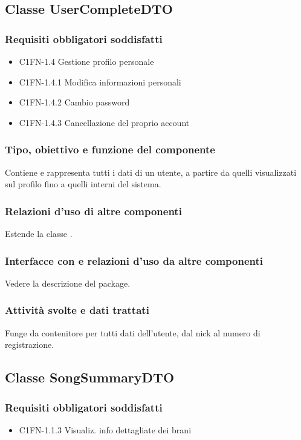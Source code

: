 \subsection{Classe UserCompleteDTO}
\subsubsection*{Requisiti obbligatori soddisfatti}
\begin{itemize}
	\item C1FN-1.4 Gestione profilo personale
	\item C1FN-1.4.1 Modifica informazioni personali
	\item C1FN-1.4.2 Cambio password
	\item C1FN-1.4.3 Cancellazione del proprio account
\end{itemize}
\subsubsection*{Tipo, obiettivo e funzione del componente}
Contiene e rappresenta tutti i dati di un utente, a partire da quelli
visualizzati sul profilo fino a quelli interni del sistema.
\subsubsection*{Relazioni d'uso di altre componenti}
Estende la classe .
\subsubsection*{Interfacce con e relazioni d'uso da altre componenti}
Vedere la descrizione del package.
\subsubsection*{Attivit\`a svolte e dati trattati}
Funge da contenitore per tutti dati dell'utente, dal nick al numero di
registrazione.

\subsection{Classe SongSummaryDTO}
\subsubsection*{Requisiti obbligatori soddisfatti}
\begin{itemize}
	\item C1FN-1.1.3 Visualiz. info dettagliate dei brani
\end{itemize}
